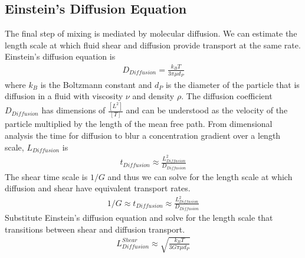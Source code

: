 \documentclass[letterpaper,10pt,english]{sphinxmanual}
\begin{document}
\subsection{Einstein’s Diffusion Equation}
\label{\detokenize{Rapid_Mix/RM_Derivations:einsteins-diffusion-equation}}\label{\detokenize{Rapid_Mix/RM_Derivations:heading-einstein-diffusion-equation}}
The final step of mixing is mediated by molecular diffusion. We can estimate the length scale at which fluid shear and diffusion provide transport at the same rate. Einstein’s diffusion equation is
\begin{equation}\label{equation:Rapid_Mix/RM_Derivations:Rapid_Mix/RM_Derivations:45}
\begin{split}D_{Diffusion} = \frac{k_B T}{3 \pi \mu d_P}\end{split}
\end{equation}
where \(k_B\) is the Boltzmann constant and \(d_P\) is the diameter of the particle that is diffusion in a fluid with viscosity \(\nu\) and density \(\rho\). The diffusion coefficient \(D_{Diffusion}\) has dimensions of \(\frac{[L^2]}{[T]}\) and can be understood as the velocity of the particle multiplied by the length of the mean free path. From dimensional analysis the time for diffusion to blur a concentration gradient over a length scale, \(L_{Diffusion}\) is
\begin{equation}\label{equation:Rapid_Mix/RM_Derivations:Rapid_Mix/RM_Derivations:46}
\begin{split}t_{Diffusion} \approx \frac{L_{Diffusion}^2}{D_{Diffusion}}\end{split}
\end{equation}
The shear time scale is \(1/G\) and thus we can solve for the length scale at which diffusion and shear have equivalent transport rates.
\begin{equation}\label{equation:Rapid_Mix/RM_Derivations:Rapid_Mix/RM_Derivations:47}
\begin{split}1/G \approx t_{Diffusion} \approx \frac{L_{Diffusion}^2}{D_{Diffusion}}\end{split}
\end{equation}
Substitute Einstein’s diffusion equation and solve for the length scale that transitions between shear and diffusion transport.
\begin{equation}\label{equation:Rapid_Mix/RM_Derivations:Rapid_Mix/RM_Derivations:48}
\begin{split}L_{Diffusion}^{Shear} \approx \sqrt{\frac{k_B T}{3 G \pi \mu  d_P}}\end{split}
\end{equation}
\end{document}
